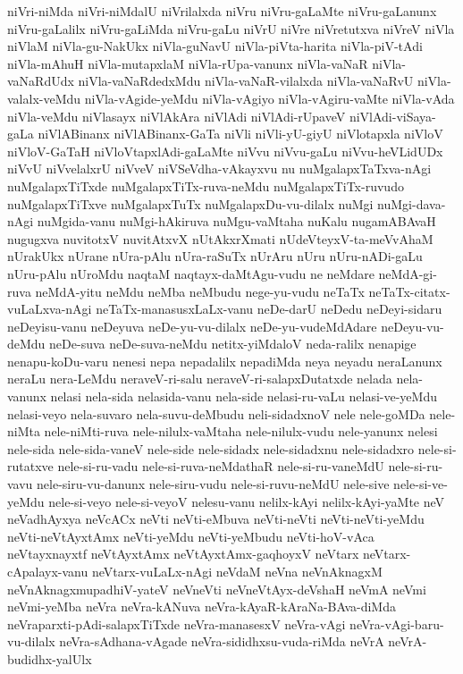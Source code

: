 {niVri-niMda
niVri-niMdalU
niVrilalxda
niVru
niVru-gaLaMte
niVru-gaLanunx
niVru-gaLalilx
niVru-gaLiMda
niVru-gaLu
niVrU
niVre
niVretutxva
niVreV
niVla
niVlaM
niVla-gu-NakUkx
niVla-guNavU
niVla-piVta-harita
niVla-piV-tAdi
niVla-mAhuH
niVla-mutapxlaM
niVla-rUpa-vanunx
niVla-vaNaR
niVla-vaNaRdUdx
niVla-vaNaRdedxMdu
niVla-vaNaR-vilalxda
niVla-vaNaRvU
niVla-valalx-veMdu
niVla-vAgide-yeMdu
niVla-vAgiyo
niVla-vAgiru-vaMte
niVla-vAda
niVla-veMdu
niVlasayx
niVlAkAra
niVlAdi
niVlAdi-rUpaveV
niVlAdi-viSaya-gaLa
niVlABinanx
niVlABinanx-GaTa
niVli
niVli-yU-giyU
niVlotapxla
niVloV
niVloV-GaTaH
niVloVtapxlAdi-gaLaMte
niVvu
niVvu-gaLu
niVvu-heVLidUDx
niVvU
niVvelalxrU
niVveV
niVSeVdha-vAkayxvu
nu
nuMgalapxTaTxva-nAgi
nuMgalapxTiTxde
nuMgalapxTiTx-ruva-neMdu
nuMgalapxTiTx-ruvudo
nuMgalapxTiTxve
nuMgalapxTuTx
nuMgalapxDu-vu-dilalx
nuMgi
nuMgi-dava-nAgi
nuMgida-vanu
nuMgi-hAkiruva
nuMgu-vaMtaha
nuKalu
nugamABAvaH
nugugxva
nuvitotxV
nuvitAtxvX
nUtAkxrXmati
nUdeVteyxV-ta-meVvAhaM
nUrakUkx
nUrane
nUra-pAlu
nUra-raSuTx
nUrAru
nUru
nUru-nADi-gaLu
nUru-pAlu
nUroMdu
naqtaM
naqtayx-daMtAgu-vudu
ne
neMdare
neMdA-gi-ruva
neMdA-yitu
neMdu
neMba
neMbudu
nege-yu-vudu
neTaTx
neTaTx-citatx-vuLaLxva-nAgi
neTaTx-manasusxLaLx-vanu
neDe-darU
neDedu
neDeyi-sidaru
neDeyisu-vanu
neDeyuva
neDe-yu-vu-dilalx
neDe-yu-vudeMdAdare
neDeyu-vu-deMdu
neDe-suva
neDe-suva-neMdu
netitx-yiMdaloV
neda-ralilx
nenapige
nenapu-koDu-varu
nenesi
nepa
nepadalilx
nepadiMda
neya
neyadu
neraLanunx
neraLu
nera-LeMdu
neraveV-ri-salu
neraveV-ri-salapxDutatxde
nelada
nela-vanunx
nelasi
nela-sida
nelasida-vanu
nela-side
nelasi-ru-vaLu
nelasi-ve-yeMdu
nelasi-veyo
nela-suvaro
nela-suvu-deMbudu
neli-sidadxnoV
nele
nele-goMDa
nele-niMta
nele-niMti-ruva
nele-nilulx-vaMtaha
nele-nilulx-vudu
nele-yanunx
nelesi
nele-sida
nele-sida-vaneV
nele-side
nele-sidadx
nele-sidadxnu
nele-sidadxro
nele-si-rutatxve
nele-si-ru-vadu
nele-si-ruva-neMdathaR
nele-si-ru-vaneMdU
nele-si-ru-vavu
nele-siru-vu-danunx
nele-siru-vudu
nele-si-ruvu-neMdU
nele-sive
nele-si-ve-yeMdu
nele-si-veyo
nele-si-veyoV
nelesu-vanu
nelilx-kAyi
nelilx-kAyi-yaMte
neV
neVadhAyxya
neVcACx
neVti
neVti-eMbuva
neVti-neVti
neVti-neVti-yeMdu
neVti-neVtAyxtAmx
neVti-yeMdu
neVti-yeMbudu
neVti-hoV-vAca
neVtayxnayxtf
neVtAyxtAmx
neVtAyxtAmx-gaqhoyxV
neVtarx
neVtarx-cApalayx-vanu
neVtarx-vuLaLx-nAgi
neVdaM
neVna
neVnAknagxM
neVnAknagxmupadhiV-yateV
neVneVti
neVneVtAyx-deVshaH
neVmA
neVmi
neVmi-yeMba
neVra
neVra-kANuva
neVra-kAyaR-kAraNa-BAva-diMda
neVraparxti-pAdi-salapxTiTxde
neVra-manasesxV
neVra-vAgi
neVra-vAgi-baru-vu-dilalx
neVra-sAdhana-vAgade
neVra-sididhxsu-vuda-riMda
neVrA
neVrA-budidhx-yalUlx
}
